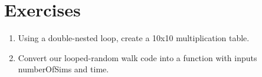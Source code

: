 \documentclass{article}\usepackage{graphicx, color}
\begin{document}
\section{Exercises}
\begin{enumerate}
  \item Using a double-nested loop, create a 10x10 multiplication table.
  \item Convert our looped-random walk code into a function with inputs numberOfSims and time.
\end{enumerate}
\end{document}

